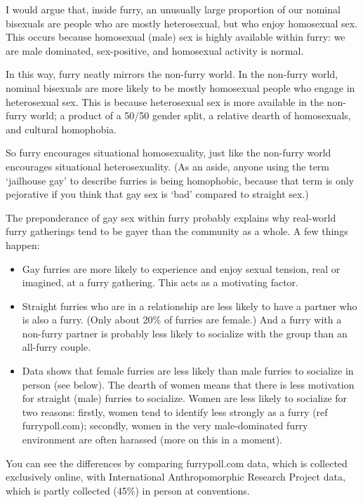 I would argue that, inside furry, an unusually large proportion of our nominal bisexuals are people who are mostly heterosexual, but who enjoy homosexual sex. This occurs because homosexual (male) sex is highly available within furry: we are male dominated, sex-positive, and homosexual activity is normal.

In this way, furry neatly mirrors the non-furry world. In the non-furry world, nominal bisexuals are more likely to be mostly homosexual people who engage in heterosexual sex. This is because heterosexual sex is more available in the non-furry world; a product of a 50/50 gender split, a relative dearth of homosexuals, and cultural homophobia.

So furry encourages situational homosexuality, just like the non-furry world encourages situational heterosexuality. (As an aside, anyone using the term `jailhouse gay' to describe furries is being homophobic, because that term is only pejorative if you think that gay sex is `bad' compared to straight sex.)

The preponderance of gay sex within furry probably explains why real-world furry gatherings tend to be gayer than the community as a whole. A few things happen:

\begin{itemize}
  \item Gay furries are more likely to experience and enjoy sexual tension, real or imagined, at a furry gathering. This acts as a motivating factor.
  \item Straight furries who are in a relationship are less likely to have a partner who is also a furry. (Only about 20\% of furries are female.) And a furry with a non-furry partner is probably less likely to socialize with the group than an all-furry couple.
  \item Data shows that female furries are less likely than male furries to socialize in person (see below). The dearth of women means that there is less motivation for straight (male) furries to socialize. Women are less likely to socialize for two reasons: firstly, women tend to identify less strongly as a furry (ref furrypoll.com); secondly, women in the very male-dominated furry environment are often harassed (more on this in a moment).
\end{itemize}

You can see the differences by comparing furrypoll.com data, which is collected exclusively online, with International Anthropomorphic Research Project data, which is partly collected (45\%) in person at conventions.


